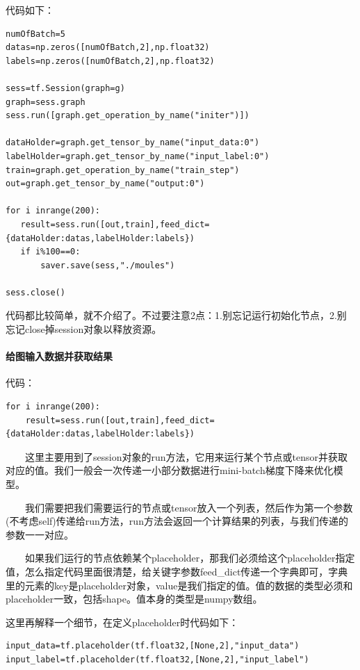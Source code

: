 代码如下：

\begin{verbatim}
numOfBatch=5
datas=np.zeros([numOfBatch,2],np.float32)
labels=np.zeros([numOfBatch,2],np.float32)

sess=tf.Session(graph=g)
graph=sess.graph
sess.run([graph.get_operation_by_name("initer")])

dataHolder=graph.get_tensor_by_name("input_data:0")
labelHolder=graph.get_tensor_by_name("input_label:0")
train=graph.get_operation_by_name("train_step")
out=graph.get_tensor_by_name("output:0")

for i inrange(200):
   result=sess.run([out,train],feed_dict={dataHolder:datas,labelHolder:labels})
   if i%100==0:
       saver.save(sess,"./moules")

sess.close()
\end{verbatim}

代码都比较简单，就不介绍了。不过要注意2点：1.别忘记运行初始化节点，2.别忘记close掉session对象以释放资源。

\paragraph{给图输入数据并获取结果}\label{ux7ed9ux56feux8f93ux5165ux6570ux636eux5e76ux83b7ux53d6ux7ed3ux679c}

代码：

\begin{verbatim}
for i inrange(200):
    result=sess.run([out,train],feed_dict={dataHolder:datas,labelHolder:labels})
\end{verbatim}

  这里主要用到了session对象的run方法，它用来运行某个节点或tensor并获取对应的值。我们一般会一次传递一小部分数据进行mini-batch梯度下降来优化模型。

  我们需要把我们需要运行的节点或tensor放入一个列表，然后作为第一个参数(不考虑self)传递给run方法，run方法会返回一个计算结果的列表，与我们传递的参数一一对应。

  如果我们运行的节点依赖某个placeholder，那我们必须给这个placeholder指定值，怎么指定代码里面很清楚，给关键字参数feed\_dict传递一个字典即可，字典里的元素的key是placeholder对象，value是我们指定的值。值的数据的类型必须和placeholder一致，包括shape。值本身的类型是numpy数组。

这里再解释一个细节，在定义placeholder时代码如下：

\begin{verbatim}
input_data=tf.placeholder(tf.float32,[None,2],"input_data")
input_label=tf.placeholder(tf.float32,[None,2],"input_label")
\end{verbatim}

